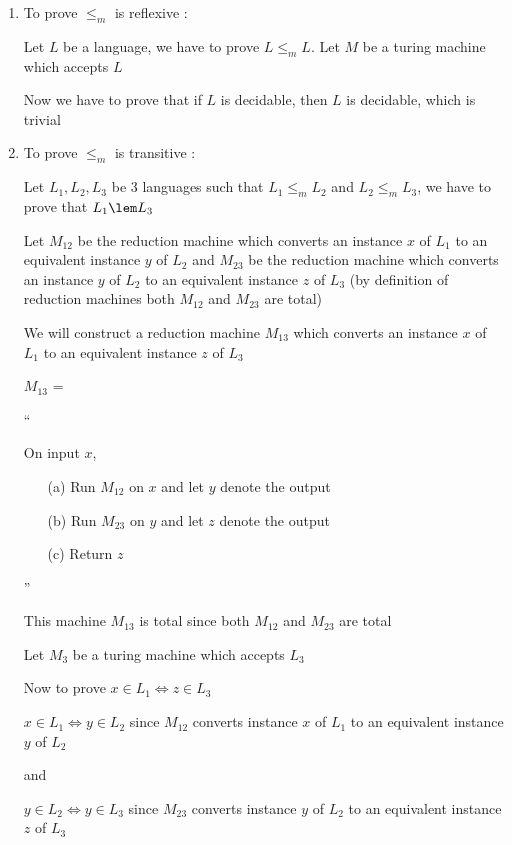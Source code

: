 \begin{enumerate}
    \item To prove $\le_m$ is reflexive :
    
    Let $L$ be a language, we have to prove $L \le_m L$. Let $M$ be a turing machine which accepts $L$

    Now we have to prove that if $L$ is decidable, then $L$ is decidable, which is trivial

    \item To prove $\le_m$ is transitive : 
    
    Let $L_1, L_2, L_3$ be 3 languages such that $L_1 \le_m L_2$ and $L_2 \le_m L_3$, we have to prove that $L_1 \lem L_3$ 

    Let $M_{12}$ be the reduction machine which converts an instance $x$ of $L_1$ to an equivalent instance $y$ of $L_2$ and $M_{23}$ be the reduction machine which converts an instance $y$ of $L_2$ to an equivalent instance $z$ of $L_3$ (by definition of reduction machines both $M_{12}$ and $M_{23}$ are total)

    We will construct a reduction machine $M_{13}$ which converts an instance $x$ of $L_1$ to an equivalent instance $z$ of $L_3$

    $M_{13}$ =

    ``
    
    On input $x$,
        \begin{enumerate}
            \item[(a)] Run $M_{12}$ on $x$ and let $y$ denote the output
            \item[(b)] Run $M_{23}$ on $y$ and let $z$ denote the output
            \item[(c)] Return $z$
        \end{enumerate}
    
    ''

    This machine $M_{13}$ is total since both $M_{12}$ and $M_{23}$ are total 

    Let $M_3$ be a turing machine which accepts $L_3$

    Now to prove $x \in L_1 \Leftrightarrow z \in L_3$

    $x \in L_1 \Leftrightarrow y \in L_2$ since $M_{12}$ converts instance $x$ of $L_1$ to an equivalent instance $y$ of $L_2$

    and

    $y \in L_2 \Leftrightarrow y \in L_3$ since $M_{23}$ converts instance $y$ of $L_2$ to an equivalent instance $z$ of $L_3$


\end{enumerate}
